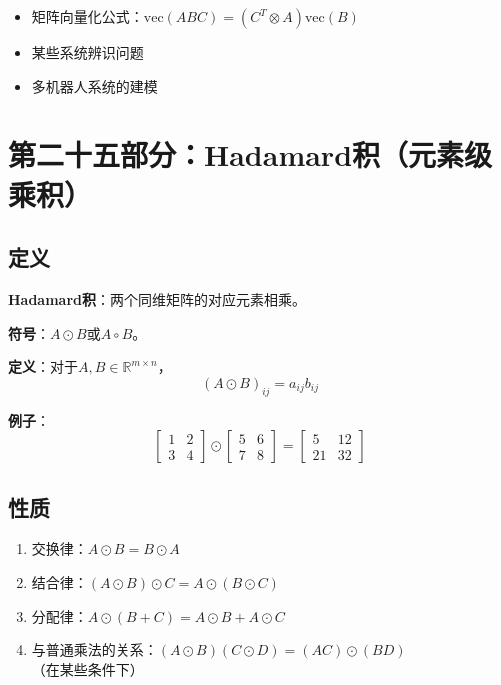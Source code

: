 \documentclass[12pt,a4paper]{article}
\begin{document}
\begin{itemize}
\item 矩阵向量化公式：$\text{vec}(ABC) = (C^T \otimes A) \text{vec}(B)$
\item 某些系统辨识问题
\item 多机器人系统的建模
\end{itemize}

\section{第二十五部分：Hadamard积（元素级乘积）}

\subsection{定义}

\textbf{Hadamard积}：两个同维矩阵的对应元素相乘。

\textbf{符号}：$A \odot B$或$A \circ B$。

\textbf{定义}：对于$A, B \in \mathbb{R}^{m \times n}$，
\begin{equation}
(A \odot B)_{ij} = a_{ij} b_{ij}
\end{equation}

\textbf{例子}：
\begin{equation}
\begin{bmatrix} 1 & 2 \\ 3 & 4 \end{bmatrix} \odot \begin{bmatrix} 5 & 6 \\ 7 & 8 \end{bmatrix} = \begin{bmatrix} 5 & 12 \\ 21 & 32 \end{bmatrix}
\end{equation}

\subsection{性质}

\begin{enumerate}
\item 交换律：$A \odot B = B \odot A$
\item 结合律：$(A \odot B) \odot C = A \odot (B \odot C)$
\item 分配律：$A \odot (B + C) = A \odot B + A \odot C$
\item 与普通乘法的关系：$(A \odot B)(C \odot D) = (AC) \odot (BD)$（在某些条件下）
\end{enumerate}
\end{document}
